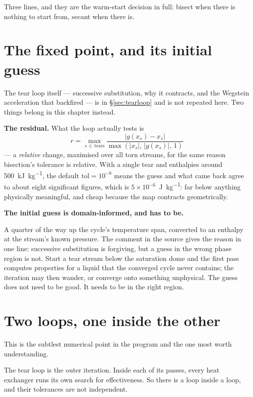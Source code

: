 \documentclass[11pt,a4paper]{report}
\begin{document}

Three lines, and they are the warm-start decision in full: bisect when
there is nothing to start from, secant when there is.

\section{The fixed point, and its initial guess}

The tear loop itself --- successive substitution, why it contracts, and
the Wegstein acceleration that backfired --- is in \S\ref{sec:tearloop}
and is not repeated here. Two things belong in this chapter instead.

\textbf{The residual.} What the loop actually tests is
\[
r = \max_{s \,\in\, \text{tears}}
    \frac{|g(x_s) - x_s|}{\max(|x_s|,\,|g(x_s)|,\,1)}
\]
--- a \emph{relative} change, maximised over all torn streams, for the
same reason bisection's tolerance is relative. With a single tear and
enthalpies around \SI{500}{\kilo\joule\per\kilogram}, the default
$\mathrm{tol} = 10^{-8}$ means the guess and what came back agree to about
eight significant figures, which is $5\times10^{-6}$~\si{\joule\per\kilogram}:
far below anything physically meaningful, and cheap because the map
contracts geometrically.

\textbf{The initial guess is domain-informed, and has to be.}


A quarter of the way up the cycle's temperature span, converted to an
enthalpy at the stream's known pressure. The comment in the source gives
the reason in one line: successive substitution is forgiving, but a guess
in the wrong phase region is not. Start a  tear stream below the
saturation dome and the first pass computes properties for a liquid that
the converged cycle never contains; the iteration may then wander, or
converge onto something unphysical. The guess does not need to be good. It
needs to be in the right region.

\section{Two loops, one inside the other}
\label{sec:twoloops}

This is the subtlest numerical point in the program and the one most worth
understanding.

The tear loop is the outer iteration. Inside each of its passes, every
heat exchanger runs its own search for effectiveness. So there is a loop
inside a loop, and their tolerances are not independent.
\end{document}
